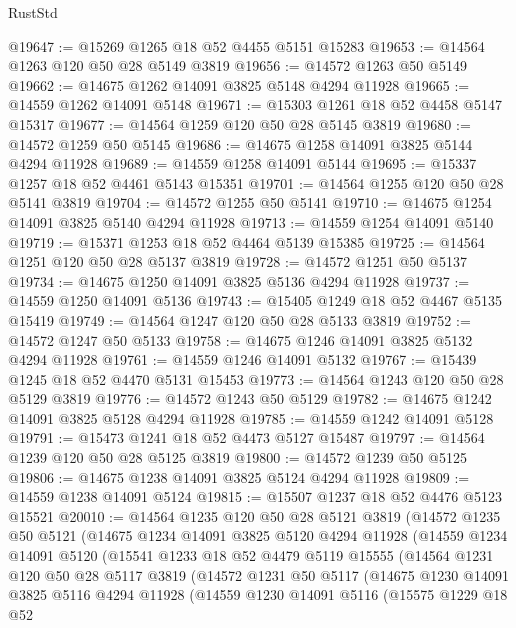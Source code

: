 \begin{lexlean}{RustStd}
\begin{coremodule}
@19647 := @15269 @1265 @18 @52 @4455 @5151 @15283
@19653 := @14564 @1263 @120 @50 @28 @5149 @3819
@19656 := @14572 @1263 @50 @5149
@19662 := @14675 @1262 @14091 @3825 @5148 @4294 @11928
@19665 := @14559 @1262 @14091 @5148
@19671 := @15303 @1261 @18 @52 @4458 @5147 @15317
@19677 := @14564 @1259 @120 @50 @28 @5145 @3819
@19680 := @14572 @1259 @50 @5145
@19686 := @14675 @1258 @14091 @3825 @5144 @4294 @11928
@19689 := @14559 @1258 @14091 @5144
@19695 := @15337 @1257 @18 @52 @4461 @5143 @15351
@19701 := @14564 @1255 @120 @50 @28 @5141 @3819
@19704 := @14572 @1255 @50 @5141
@19710 := @14675 @1254 @14091 @3825 @5140 @4294 @11928
@19713 := @14559 @1254 @14091 @5140
@19719 := @15371 @1253 @18 @52 @4464 @5139 @15385
@19725 := @14564 @1251 @120 @50 @28 @5137 @3819
@19728 := @14572 @1251 @50 @5137
@19734 := @14675 @1250 @14091 @3825 @5136 @4294 @11928
@19737 := @14559 @1250 @14091 @5136
@19743 := @15405 @1249 @18 @52 @4467 @5135 @15419
@19749 := @14564 @1247 @120 @50 @28 @5133 @3819
@19752 := @14572 @1247 @50 @5133
@19758 := @14675 @1246 @14091 @3825 @5132 @4294 @11928
@19761 := @14559 @1246 @14091 @5132
@19767 := @15439 @1245 @18 @52 @4470 @5131 @15453
@19773 := @14564 @1243 @120 @50 @28 @5129 @3819
@19776 := @14572 @1243 @50 @5129
@19782 := @14675 @1242 @14091 @3825 @5128 @4294 @11928
@19785 := @14559 @1242 @14091 @5128
@19791 := @15473 @1241 @18 @52 @4473 @5127 @15487
@19797 := @14564 @1239 @120 @50 @28 @5125 @3819
@19800 := @14572 @1239 @50 @5125
@19806 := @14675 @1238 @14091 @3825 @5124 @4294 @11928
@19809 := @14559 @1238 @14091 @5124
@19815 := @15507 @1237 @18 @52 @4476 @5123 @15521
@20010 := @14564
    @1235
    @120
    @50
    @28
    @5121
    @3819
    (@14572
      @1235
      @50
      @5121
      (@14675
        @1234
        @14091
        @3825
        @5120
        @4294
        @11928
        (@14559
          @1234
          @14091
          @5120
          (@15541
            @1233
            @18
            @52
            @4479
            @5119
            @15555
            (@14564
              @1231
              @120
              @50
              @28
              @5117
              @3819
              (@14572
                @1231
                @50
                @5117
                (@14675
                  @1230
                  @14091
                  @3825
                  @5116
                  @4294
                  @11928
                  (@14559
                    @1230
                    @14091
                    @5116
                    (@15575
                      @1229
                      @18
                      @52

\end{coremodule}
\end{lexlean}
